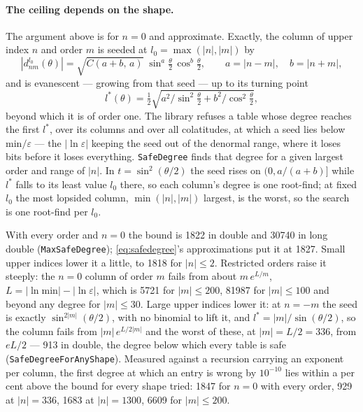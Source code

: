 \documentclass[11pt,a4paper]{article}
\newcommand{\code}[1]{\texttt{#1}}
\begin{document}
\paragraph{The ceiling depends on the shape.}  The argument above is for
$n = 0$ and approximate.  Exactly, the column of upper index $n$ and order
$m$ is seeded at $l_0 = \max(|n|,|m|)$ by
\begin{equation}
  |d^{l_0}_{nm}(\theta)| = \sqrt{C(a+b,\,a)}\;\sin^a\tfrac\theta2\,
  \cos^b\tfrac\theta2, \qquad a = |n-m|,\quad b = |n+m|,
\end{equation}
and is evanescent --- growing from that seed --- up to its turning point
\begin{equation}
  l^*(\theta) = \tfrac12\sqrt{a^2/\sin^2\tfrac\theta2 +
  b^2/\cos^2\tfrac\theta2},
  \label{eq:turningpoint}
\end{equation}
beyond which it is of order one.  The library refuses a table whose
degree reaches the first $l^*$, over its columns and over all
colatitudes, at which a seed lies below $\mathrm{min}/\varepsilon$ ---
the $|\ln\varepsilon|$ keeping the seed out of the denormal range, where
it loses bits before it loses everything.  \code{SafeDegree} finds that
degree for a given largest order and range of $|n|$.  In $t =
\sin^2(\theta/2)$ the seed rises on $(0, a/(a+b)]$ while $l^*$ falls to
its least value $l_0$ there, so each column's degree is one root-find; at
fixed $l_0$ the most lopsided column, $\min(|n|,|m|)$ largest, is the
worst, so the search is one root-find per $l_0$.

With every order and $n = 0$ the bound is 1822 in double and 30740 in long
double (\code{MaxSafeDegree}); \eqref{eq:safedegree}'s approximations put it
at 1827.  Small upper indices lower it a little, to 1818 for $|n|\le2$.
Restricted orders raise it steeply: the $n=0$ column of order $m$ fails
from about $m\,e^{L/m}$, $L = |\ln\mathrm{min}|-|\ln\varepsilon|$, which is
5721 for $|m|\le200$, 81987 for $|m|\le100$ and beyond any degree for
$|m|\le30$.  Large upper indices lower it: at $n = -m$ the seed is exactly
$\sin^{2|m|}(\theta/2)$, with no binomial to lift it, and $l^* =
|m|/\sin(\theta/2)$, so the column fails from $|m|\,e^{L/2|m|}$ and the
worst of these, at $|m| = L/2 = 336$, from $eL/2$ --- 913 in double, the
degree below which every table is safe (\code{SafeDegreeForAnyShape}).
Measured against a recursion carrying an exponent per column, the first
degree at which an entry is wrong by $10^{-10}$ lies within a per cent
above the bound for every shape tried: 1847 for $n=0$ with every order,
929 at $|n| = 336$, 1683 at $|n| = 1300$, 6609 for $|m|\le200$.
\end{document}
